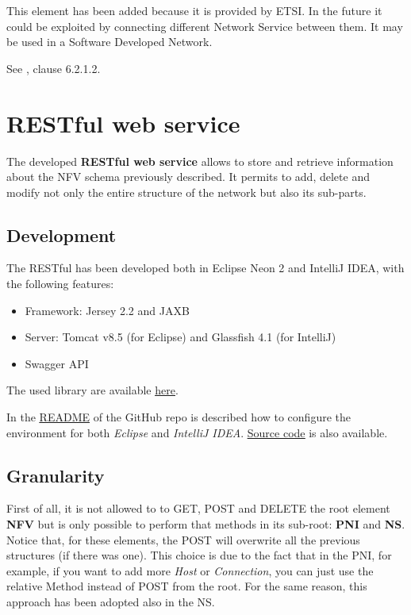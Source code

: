 \documentclass[11pt, english]{article}
\begin{document}
This element has been added because it is provided by ETSI. In the future it could be exploited by connecting different Network Service between them. It may be used in a Software Developed Network.

See \cite{etsi}, clause 6.2.1.2.

\section{RESTful web service}
The developed \textbf{RESTful web service} allows to store and retrieve information about the NFV schema previously described. It permits to add, delete and modify not only the entire structure of the network but also its sub-parts.

\subsection{Development}
The RESTful has been developed both in Eclipse Neon 2 and IntelliJ IDEA, with the following features:
\begin{itemize}
    \item Framework: Jersey 2.2 and JAXB
    \item Server: Tomcat v8.5 (for Eclipse) and Glassfish 4.1 (for IntelliJ)
    \item Swagger API
\end{itemize}

The used library are available  \href{https://github.com/netgroup-polito/nfv-data-model/tree/master/lib}{\underline{here}}.

In the \href{https://github.com/netgroup-polito/nfv-data-model/blob/master/README.md#configuration}{\underline{README}} of the GitHub repo is described how to configure the environment for both \textit{Eclipse} and \textit{IntelliJ IDEA}. \href{https://github.com/netgroup-polito/nfv-data-model}{\underline{Source code}} is also available. 

\subsection{Granularity}
First of all, it is not allowed to to GET, POST and DELETE the root element \textbf{NFV} but is only possible to perform that methods in its sub-root: \textbf{PNI} and \textbf{NS}. Notice that, for these elements, the POST will overwrite all the previous structures (if there was one). This choice is due to the fact that in the PNI, for example, if you want to add more \textit{Host} or \textit{Connection}, you can just use the relative Method instead of POST from the root. For the same reason, this approach has been adopted also in the NS.
\end{document}

